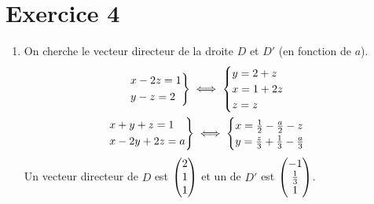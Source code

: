 \part{Exercice 4}

\begin{enumerate}
	\item On cherche le vecteur directeur de la droite $D$ et $D'$ (en fonction de $a$).
		\begin{gather*}
			\begin{rcases*}
				x - 2z = 1\\
				y - z = 2
			\end{rcases*} \iff \begin{cases}
				y = 2 + z\\
				x = 1 + 2z\\
				z = z
			\end{cases}\\
			\begin{rcases*}
				x+y+z=1\\
				x-2y+2z= a
			\end{rcases*} \iff \begin{cases}
				x = \frac{1}{2} - \frac{a}{2} - z\\
				y = \frac{z}{3} + \frac{1}{3} - \frac{a}{3}
			\end{cases}
		\end{gather*}
		Un vecteur directeur de $D$ est $\begin{pmatrix} 2\\1\\1 \end{pmatrix}$ et un de $D'$ est $\begin{pmatrix} -1\\\frac{1}{3}\\1 \end{pmatrix}$.
\end{enumerate}

